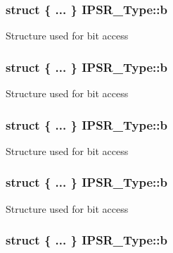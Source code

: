 \hypertarget{union_i_p_s_r___type_a8694433a871ae74beeb7aa9abeea37bb}{
\subsubsection[{b}]{\setlength{\rightskip}{0pt plus 5cm}struct \{ ... \}   I\-P\-S\-R\-\_\-\-Type\-::b}}\label{union_i_p_s_r___type_a8694433a871ae74beeb7aa9abeea37bb}
Structure used for bit access \hypertarget{union_i_p_s_r___type_ac3bf5939c6cca6068a8d6dcd215abeac}{
\subsubsection[{b}]{\setlength{\rightskip}{0pt plus 5cm}struct \{ ... \}   I\-P\-S\-R\-\_\-\-Type\-::b}}\label{union_i_p_s_r___type_ac3bf5939c6cca6068a8d6dcd215abeac}
Structure used for bit access \hypertarget{union_i_p_s_r___type_ae4cb583771d72a69e09ee3ad92b8c94c}{
\subsubsection[{b}]{\setlength{\rightskip}{0pt plus 5cm}struct \{ ... \}   I\-P\-S\-R\-\_\-\-Type\-::b}}\label{union_i_p_s_r___type_ae4cb583771d72a69e09ee3ad92b8c94c}
Structure used for bit access \hypertarget{union_i_p_s_r___type_a81feb1bfa01fe99ebcce023b63b9b247}{
\subsubsection[{b}]{\setlength{\rightskip}{0pt plus 5cm}struct \{ ... \}   I\-P\-S\-R\-\_\-\-Type\-::b}}\label{union_i_p_s_r___type_a81feb1bfa01fe99ebcce023b63b9b247}
Structure used for bit access \hypertarget{union_i_p_s_r___type_aa9916267c9436e800b931582da201003}{
\subsubsection[{b}]{\setlength{\rightskip}{0pt plus 5cm}struct \{ ... \}   I\-P\-S\-R\-\_\-\-Type\-::b}}\label{union_i_p_s_r___type_aa9916267c9436e800b931582da201003}
